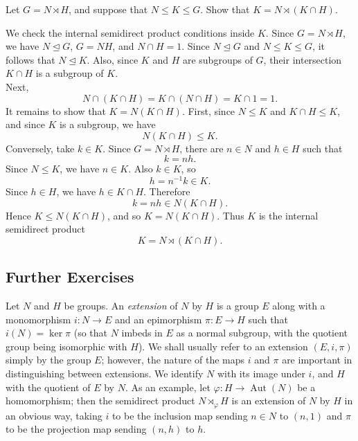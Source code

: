 \documentclass[../Odyssey_Project.tex]{subfiles}
\begin{document}
\begin{exercise}
\label{ex:2.10}
Let $G = N \rtimes H$, and suppose that $N \leq K \leq G$. Show that $K = N \rtimes (K \cap H)$.
\end{exercise}
\begin{solution}
    We check the internal semidirect product conditions inside $K$. Since $G = N \rtimes H$, we have $N \trianglelefteq G$, $G = NH$, and $N \cap H = 1$. Since $N \trianglelefteq G$ and $N \leq K \leq G$, it follows that $N \trianglelefteq K$. Also, since $K$ and $H$ are subgroups of $G$, their intersection $K \cap H$ is a subgroup of $K$. \\
    Next,
    \[
        N \cap (K \cap H)
        =
        K \cap (N \cap H)
        =
        K \cap 1
        =
        1.
    \]
    It remains to show that $K = N(K \cap H)$. First, since $N \leq K$ and $K \cap H \leq K$, and since $K$ is a subgroup, we have
    \[
        N(K \cap H) \leq K.
    \]
    Conversely, take $k \in K$. Since $G = N \rtimes H$, there are $n \in N$ and $h \in H$ such that
    \[
        k = nh.
    \]
    Since $N \leq K$, we have $n \in K$. Also $k \in K$, so
    \[
        h = n^{-1}k \in K.
    \]
    Since $h \in H$, we have $h \in K \cap H$. Therefore
    \[
        k = nh \in N(K \cap H).
    \]
    Hence $K \leq N(K \cap H)$, and so $K = N(K \cap H)$. Thus $K$ is the internal semidirect product
    \[
        K = N \rtimes (K \cap H).
    \]
\end{solution}

\subsection*{Further Exercises}

\noindent Let $N$ and $H$ be groups. An \emph{extension} of $N$ by $H$ is a group $E$ along with a monomorphism $i : N \to E$ and an epimorphism $\pi : E \to H$ such that $i(N) = \ker \pi$ (so that $N$ imbeds in $E$ as a normal subgroup, with the quotient group being isomorphic with $H$). We shall usually refer to an extension $(E,i,\pi)$ simply by the group $E$; however, the nature of the maps $i$ and $\pi$ are important in distinguishing between extensions. We identify $N$ with its image under $i$, and $H$ with the quotient of $E$ by $N$. As an example, let $\varphi : H \to \operatorname{Aut}(N)$ be a homomorphism; then the semidirect product $N \rtimes_{\varphi} H$ is an extension of $N$ by $H$ in an obvious way, taking $i$ to be the inclusion map sending $n \in N$ to $(n,1)$ and $\pi$ to be the projection map sending $(n,h)$ to $h$.
\end{document}
